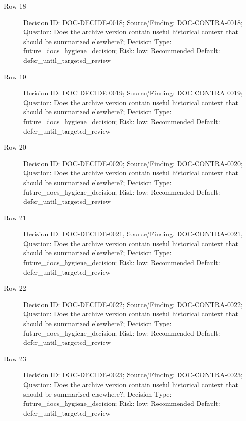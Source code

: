 \documentclass[9pt,a4paper,openany]{book}
\begin{document}
\begin{description}
\item[Row 18] Decision ID: DOC-\allowbreak{}DECIDE-\allowbreak{}0018; Source/\allowbreak{}Finding: DOC-\allowbreak{}CONTRA-\allowbreak{}0018; Question: Does the archive version contain useful historical context that should be summarized elsewhere?; Decision Type: future\_\allowbreak{}docs\_\allowbreak{}hygiene\_\allowbreak{}decision; Risk: low; Recommended Default: defer\_\allowbreak{}until\_\allowbreak{}targeted\_\allowbreak{}review
\item[Row 19] Decision ID: DOC-\allowbreak{}DECIDE-\allowbreak{}0019; Source/\allowbreak{}Finding: DOC-\allowbreak{}CONTRA-\allowbreak{}0019; Question: Does the archive version contain useful historical context that should be summarized elsewhere?; Decision Type: future\_\allowbreak{}docs\_\allowbreak{}hygiene\_\allowbreak{}decision; Risk: low; Recommended Default: defer\_\allowbreak{}until\_\allowbreak{}targeted\_\allowbreak{}review
\item[Row 20] Decision ID: DOC-\allowbreak{}DECIDE-\allowbreak{}0020; Source/\allowbreak{}Finding: DOC-\allowbreak{}CONTRA-\allowbreak{}0020; Question: Does the archive version contain useful historical context that should be summarized elsewhere?; Decision Type: future\_\allowbreak{}docs\_\allowbreak{}hygiene\_\allowbreak{}decision; Risk: low; Recommended Default: defer\_\allowbreak{}until\_\allowbreak{}targeted\_\allowbreak{}review
\item[Row 21] Decision ID: DOC-\allowbreak{}DECIDE-\allowbreak{}0021; Source/\allowbreak{}Finding: DOC-\allowbreak{}CONTRA-\allowbreak{}0021; Question: Does the archive version contain useful historical context that should be summarized elsewhere?; Decision Type: future\_\allowbreak{}docs\_\allowbreak{}hygiene\_\allowbreak{}decision; Risk: low; Recommended Default: defer\_\allowbreak{}until\_\allowbreak{}targeted\_\allowbreak{}review
\item[Row 22] Decision ID: DOC-\allowbreak{}DECIDE-\allowbreak{}0022; Source/\allowbreak{}Finding: DOC-\allowbreak{}CONTRA-\allowbreak{}0022; Question: Does the archive version contain useful historical context that should be summarized elsewhere?; Decision Type: future\_\allowbreak{}docs\_\allowbreak{}hygiene\_\allowbreak{}decision; Risk: low; Recommended Default: defer\_\allowbreak{}until\_\allowbreak{}targeted\_\allowbreak{}review
\item[Row 23] Decision ID: DOC-\allowbreak{}DECIDE-\allowbreak{}0023; Source/\allowbreak{}Finding: DOC-\allowbreak{}CONTRA-\allowbreak{}0023; Question: Does the archive version contain useful historical context that should be summarized elsewhere?; Decision Type: future\_\allowbreak{}docs\_\allowbreak{}hygiene\_\allowbreak{}decision; Risk: low; Recommended Default: defer\_\allowbreak{}until\_\allowbreak{}targeted\_\allowbreak{}review

\end{description}
\end{document}
